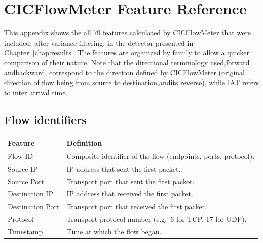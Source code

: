 
\chapter{CICFlowMeter Feature Reference}
\label{app:features}

This appendix shows the all 79 features calculated by CICFlowMeter that were included, after variance filtering, in the detector presented in Chapter~\ref{chap:results}. The features are organized by family to allow a quicker comparison of their nature. Note that the directional terminology used,forward andbackward, correspond to the direction defined by CICFlowMeter (original direction of flow being from source to destination,andits reverse), while IAT refers to inter arrival time.

\section{Flow identifiers}
\label{app:feat_id}

\renewcommand{\arraystretch}{1.25}
\begin{tabularx}{\textwidth}{lX}
  \toprule
  \textbf{Feature} & \textbf{Definition} \\
  \midrule
  Flow ID          & Composite identifier of the flow (endpoints, ports, protocol). \\
  Source IP        & IP address that sent the first packet. \\
  Source Port      & Transport port that sent the first packet. \\
  Destination IP   & IP address that received the first packet. \\
  Destination Port & Transport port that received the first packet. \\
  Protocol         & Transport protocol number (e.g.\ 6 for TCP, 17 for UDP). \\
  Timestamp        & Time at which the flow began. \\
  \bottomrule
\end{tabularx}

